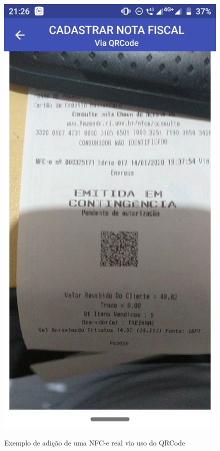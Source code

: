 \begin{figure}[h]
    \centering
    \caption{Exemplo de adição de uma NFC-e real via uso do QRCode}
    \includegraphics[scale=0.15]{tcc/figures/app/app_codigo_qrcode_solicitacao.png}
    \label{appQRCodeSolicitacaoFig}
\end{figure}

